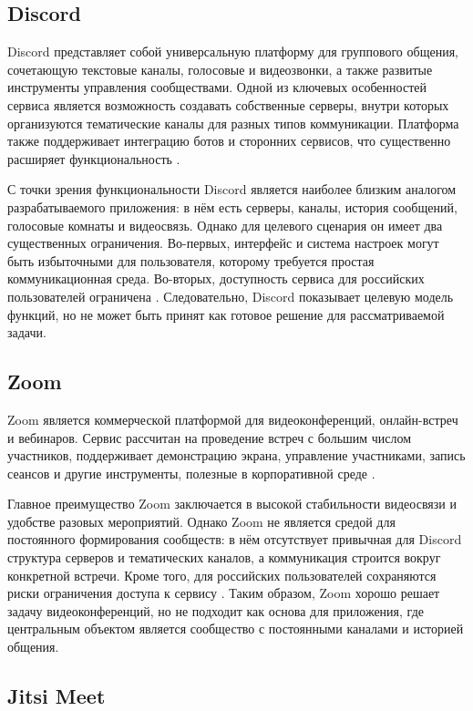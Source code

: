 \documentclass[a4paper,12pt]{extarticle}
\begin{document}
\subsection{Discord}

Discord представляет собой универсальную платформу для группового общения, сочетающую текстовые каналы, голосовые и видеозвонки, а также развитые инструменты управления сообществами. Одной из ключевых особенностей сервиса является возможность создавать собственные серверы, внутри которых организуются тематические каналы для разных типов коммуникации. Платформа также поддерживает интеграцию ботов и сторонних сервисов, что существенно расширяет функциональность \cite{discord}.

С точки зрения функциональности Discord является наиболее близким аналогом разрабатываемого приложения: в нём есть серверы, каналы, история сообщений, голосовые комнаты и видеосвязь. Однако для целевого сценария он имеет два существенных ограничения. Во-первых, интерфейс и система настроек могут быть избыточными для пользователя, которому требуется простая коммуникационная среда. Во-вторых, доступность сервиса для российских пользователей ограничена \cite{discord_russia}. Следовательно, Discord показывает целевую модель функций, но не может быть принят как готовое решение для рассматриваемой задачи.

\subsection{Zoom}

Zoom является коммерческой платформой для видеоконференций, онлайн-встреч и вебинаров. Сервис рассчитан на проведение встреч с большим числом участников, поддерживает демонстрацию экрана, управление участниками, запись сеансов и другие инструменты, полезные в корпоративной среде \cite{zoom}.

Главное преимущество Zoom заключается в высокой стабильности видеосвязи и удобстве разовых мероприятий. Однако Zoom не является средой для постоянного формирования сообществ: в нём отсутствует привычная для Discord структура серверов и тематических каналов, а коммуникация строится вокруг конкретной встречи. Кроме того, для российских пользователей сохраняются риски ограничения доступа к сервису \cite{zoom_russia}. Таким образом, Zoom хорошо решает задачу видеоконференций, но не подходит как основа для приложения, где центральным объектом является сообщество с постоянными каналами и историей общения.

\subsection{Jitsi Meet}
\end{document}
